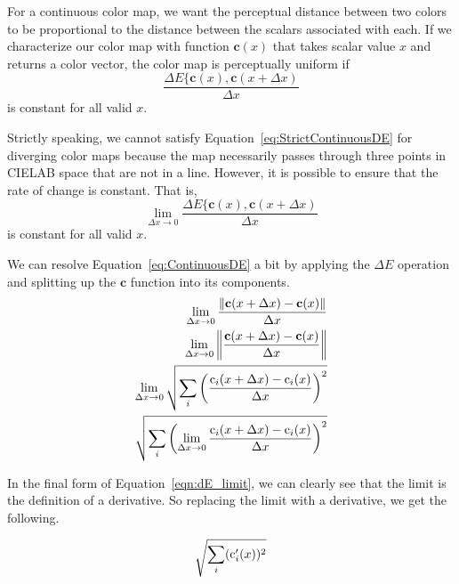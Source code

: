 \documentclass{vgtc}                          %
\newcommand{\Lab}{CIELAB\xspace}
\newcommand{\DeltaE}{\ensuremath{\Delta{}E}\xspace}
\newcommand*{\cvec}[1]{\mathbf{#1}}
\begin{document}
For a continuous color map, we want the perceptual distance between two
colors to be proportional to the distance between the scalars associated
with each.    If we characterize our color map with function $\cvec{c}(x)$
that takes scalar value $x$ and returns a color vector, the color map is
perceptually uniform if
\begin{equation}
  \frac{\DeltaE\{\cvec{c}(x),\cvec{c}(x+\Delta{x})}{\Delta{}x}
  \label{eq:StrictContinuousDE}
\end{equation}
is constant for all valid $x$.

Strictly speaking, we cannot satisfy Equation~\ref{eq:StrictContinuousDE}
for diverging color maps because the map necessarily passes through three
points in \Lab space that are not in a line.  However, it is possible to
ensure that the rate of change is constant.  That is,
\begin{equation}
  \lim_{\Delta{}x \rightarrow 0}{
    \frac{\DeltaE\{\cvec{c}(x),\cvec{c}(x+\Delta{x})}{\Delta{}x} }
  \label{eq:ContinuousDE}
\end{equation}
is constant for all valid $x$.

We can resolve Equation~\ref{eq:ContinuousDE} a bit by applying the \DeltaE
operation and splitting up the $\cvec{c}$ function into its components.
\begin{equation}
  \begin{split}
    { \lim_{\Delta x \rightarrow 0}
      \frac{\left\lVert \cvec{c}(x+\Delta x) - \cvec{c}(x) \right\rVert}
      {\Delta x}} \\
    { \lim_{\Delta x \rightarrow 0}
      \left\lVert \frac{\cvec{c}(x+\Delta x)- \cvec{c}(x)}
	  {\Delta x} \right\rVert } \\
    { \lim_{\Delta x \rightarrow 0}
      \sqrtsign{ \sum_i \left( \frac
	  {\operatorname{c}_i(x+\Delta x)
	    - \operatorname{c}_i(x)}
	  {\Delta x} \right)^2 } } \\
    {\sqrtsign{ \sum_i \left( \lim_{\Delta x \rightarrow 0}
       \frac
	  {\operatorname{c}_i(x+\Delta x)
	    - \operatorname{c}_i(x)}
	  {\Delta x} \right)^2 } }
  \end{split}
  \label{eqn:dE_limit}
\end{equation}

In the final form of Equation~\ref{eqn:dE_limit}, we can clearly see that
the limit is the definition of a derivative.  So replacing the limit with a
derivative, we get the following.

\begin{equation}
  \sqrtsign{\sum_i (\operatorname{c}_{i}'(x))^2}
  \label{eqn:dE_comp_dif}
\end{equation}
\end{document}
